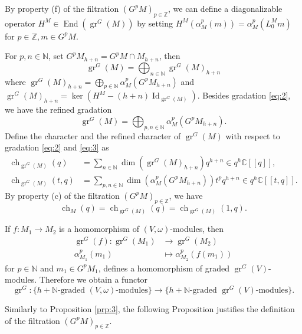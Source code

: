 \documentclass[12pt,a4paper]{article}
\DeclareMathOperator{\Id}{Id}
\DeclareMathOperator{\gr}{gr}
\DeclareMathOperator{\End}{End}
\DeclareMathOperator{\ch}{ch}
\begin{document}
By property (f) of the filtration $(G^pM)_{p\in \mathbb{Z}}$, we can define a diagonalizable operator $H^M\in \End(\gr^G(M))$ by setting $H^M(\alpha^p_M(m))=\alpha^p_M(L^M_0m)$ for $p\in \mathbb{Z}, m\in G^pM$.

For $p,n\in \mathbb{N}$, set $G^pM_{h+n}=G^pM\cap M_{h+n}$, then
\begin{equation}
  \label{eq:2}
  \gr^G(M)=\bigoplus_{n\in \mathbb{N}}\gr^G(M)_{h+n}
\end{equation}
where $\gr^G(M)_{h+n}=\bigoplus_{p\in \mathbb{N}}\alpha^p_M(G^pM_{h+n})$ and $\gr^G(M)_{h+n}=\ker(H^M-(h+n)\Id_{\gr^G(M)})$.
Besides gradation \eqref{eq:2}, we have the refined gradation
\begin{equation}
  \label{eq:3}
  \gr^G(M)=\bigoplus_{p,n\in \mathbb{N}}\alpha^p_M(G^pM_{h+n}).
\end{equation}
Define the character and the refined character of $\gr^G(M)$ with respect to gradation \eqref{eq:2} and \eqref{eq:3} as
\begin{align*}
  \ch_{\gr^G(M)}(q)&=\sum_{n\in \mathbb{N}}\dim(\gr^G(M)_{h+n})q^{h+n} \in q^h\mathbb{C}[[q]],\\
  \ch_{\gr^G(M)}(t,q)&=\sum_{p,n\in \mathbb{N}}\dim(\alpha^p_M(G^pM_{h+n}))t^pq^{h+n}\in q^{h}\mathbb{C}[[t,q]].
\end{align*}
By property (c) of the filtration $(G^pM)_{p\in \mathbb{Z}}$, we have
\begin{equation*}
  \ch_M(q)=\ch_{\gr^G(M)}(q)=\ch_{\gr^G(M)}(1,q).
\end{equation*}

If $f:M_1\to M_2$ is a homomorphism of $(V,\omega)$-modules, then
\begin{align*}
  \gr^G(f):\gr^G(M_1)&\to \gr^G(M_2) \\
  \alpha^p_{M_1}(m_1)&\mapsto \alpha^p_{M_2}(f(m_1))
\end{align*}
for $p\in \mathbb{N}$ and $m_1\in G^pM_1$, defines a homomorphism of graded $\gr^G(V)$-modules.
Therefore we obtain a functor
\begin{equation*}
  \gr^G:\{\text{$h+\mathbb{N}$-graded $(V,\omega)$-modules}\}\to \{\text{$h+\mathbb{N}$-graded $\gr^G(V)$-modules}\}.
\end{equation*}

Similarly to Proposition \ref{prp:3}, the following Proposition justifies the definition of the filtration $(G^pM)_{p\in \mathbb{Z}}$.
\end{document}
